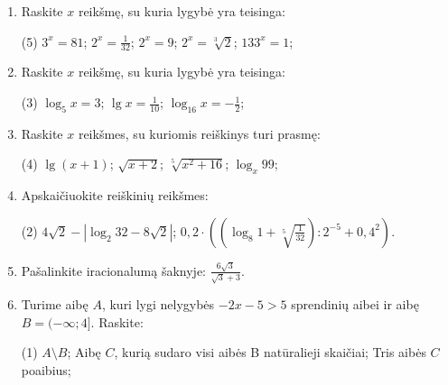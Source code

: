 \documentclass[a4paper]{article}
\begin{document}
\begin{enumerate}
      \item Raskite $x$ reikšmę, su kuria lygybė yra teisinga:

            \begin{tasks}[item-format={\normalfont}, after-item-skip=4mm](5)
                  \task $3^{x}=81$;
                  \task $2^{x}=\frac{1}{32}$;
                  \task $2^{x}=9$;
                  \task $2^{x}=\sqrt[3]{2}$;
                  \task $133^{x}=1$;
            \end{tasks}

      \item Raskite $x$  reikšmę, su kuria lygybė yra teisinga:
            \begin{tasks}[item-format={\normalfont}, after-item-skip=4mm](3)
                  \task $\log_{5} x=3$;
                  \task $\lg x=\frac{1}{10}$;
                  \task $\log_{16} x=-\frac{1}{2}$;
            \end{tasks}

      \item Raskite $x$ reikšmes, su kuriomis reiškinys turi prasmę:
            \begin{tasks}[item-format={\normalfont}, after-item-skip=4mm](4)
                  \task $\lg (x+1)$;
                  \task $\sqrt{x+2}$;
                  \task $\sqrt[5]{x^{2}+16}$;
                  \task $\log_{x}99$;
            \end{tasks}

      \item Apskaičiuokite reiškinių reikšmes:
            \begin{tasks}[item-format={\normalfont}, after-item-skip=10mm](2)
                  \task $4\sqrt{2}-\left|\log_{2}32-8\sqrt{2}\right|$;
                  \task $0,2 \cdot
                        ((\log_{8}1+\sqrt[5]{\frac{1}{32}}):2^{-5}+0,4^2)$.
            \end{tasks}
      \item Pašalinkite iracionalumą šaknyje: $\frac{6\sqrt{3}}{\sqrt{3}+3}$.
      \item Turime aibę $A$, kuri lygi nelygybės $-2x-5>5$ sprendinių aibei ir
            aibę $B=(-\infty;4]$. Raskite:
            \begin{tasks}[item-format={\normalfont}, after-item-skip=2mm](1)
                  \task $A \setminus B$;
                  \task Aibę $C$, kurią sudaro visi aibės B natūralieji
                  skaičiai;
                  \task Tris aibės $C$ poaibius;
            \end{tasks}

\end{enumerate}
\end{document}
